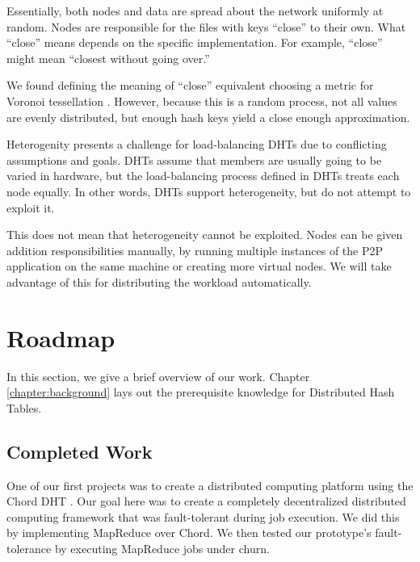 Essentially, both nodes and data are spread about the network uniformly at random.
Nodes are responsible for the files with keys ``close'' to their own.
What ``close'' means depends on the specific implementation.
For example, ``close'' might mean ``closest without going over.''
 
We found defining the meaning of ``close'' equivalent choosing a metric for Voronoi tessellation \cite{vhash}.
However, because this is a random process, not all values are evenly distributed, but enough hash keys yield a close enough approximation.

Heterogenity presents a challenge for load-balancing DHTs due to conflicting assumptions and goals. 
DHTs assume that members are usually going to be varied in hardware, but the load-balancing process defined in DHTs treats each node equally.
In other words, DHTs support heterogeneity, but do not attempt to exploit it.

This does not mean that heterogeneity cannot be exploited.
Nodes can be given addition responsibilities manually, by running multiple instances of the P2P application on the same machine or creating more virtual nodes.
We will take advantage of this for distributing the workload automatically.


\section{Roadmap}

In this section, we give a brief overview of our work.
Chapter \ref{chapter:background} lays out the prerequisite knowledge for Distributed Hash Tables.
\subsection{Completed Work}

One of our first projects was to create a distributed computing platform using the Chord DHT \cite{chordreduce}.
Our goal here was to create a completely decentralized distributed computing framework that was fault-tolerant during job execution.
We did this by implementing MapReduce over Chord.
We then tested our prototype's fault-tolerance by executing MapReduce jobs under churn.

